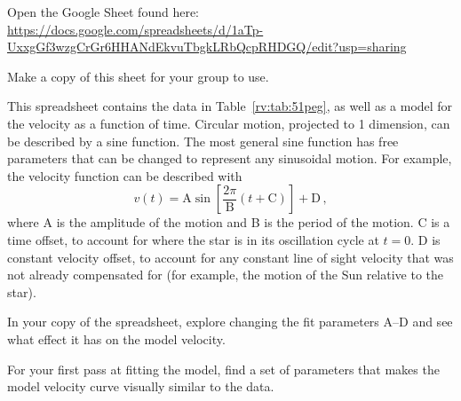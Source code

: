 \begin{steps}
	\item Open the Google Sheet found here: \url{https://docs.google.com/spreadsheets/d/1aTp-UxxgGf3wzgCrGr6HHANdEkvuTbgkLRbQcpRHDGQ/edit?usp=sharing}
	
	\item Make a copy of this sheet for your group to use.
\end{steps}

This spreadsheet contains the data in Table~\ref{rv:tab:51peg}, as well as a model for the velocity as a function of time. Circular motion, projected to 1 dimension, can be described by a sine function. The most general sine function has free parameters that can be changed to represent any sinusoidal motion. For example, the velocity function can be described with
\begin{equation}
 v(t) = \textrm{A} \sin \left[\frac{2 \pi}{\textrm{B}}\left(t + \textrm{C}\right)\right] + \textrm{D} \,,
\end{equation}
where A is the amplitude of the motion and B is the period of the motion. C is a time offset, to account for where the star is in its oscillation cycle at $t=0$. D is constant velocity offset, to account for any constant line of sight velocity that was not already compensated for (for example, the motion of the Sun relative to the star).


%

\begin{steps}
	\item In your copy of the spreadsheet, explore changing the fit parameters A--D and see what effect it has on the model velocity.
	
	\item For your first pass at fitting the model, find a set of parameters that makes the model velocity curve visually similar to the data.
\end{steps}

